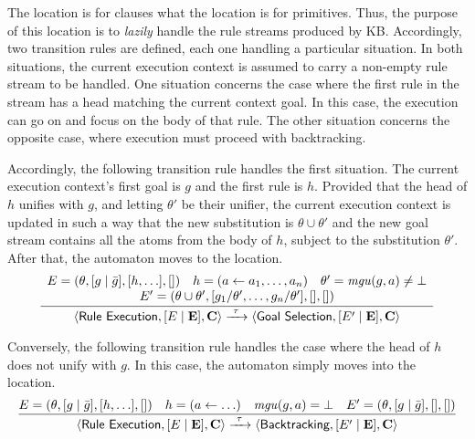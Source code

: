 \documentclass[12pt,a4paper,openright,twoside]{book}
\begin{document}
The  location is for clauses what the  location is for primitives.
%
Thus, the purpose of this location is to \emph{lazily} handle the rule streams produced by KB.
%
Accordingly, two transition rules are defined, each one handling a particular situation.
%
In both situations, the current execution context is assumed to carry a non-empty rule stream to be handled.
%
One situation concerns the case where the first rule in the stream has a head matching the current context goal.
%
In this case, the execution can go on and focus on the body of that rule.
%
The other situation concerns the opposite case, where execution must proceed with backtracking.
%

Accordingly, the following transition rule handles the first situation.
%
The current execution context's first goal is $g$ and the first rule is $h$.
%
Provided that the head of $h$ unifies with $g$, and letting $\theta'$ be their unifier, the current execution context is updated in such a way that the new substitution is $\theta \cup \theta'$ and the new goal stream contains all the atoms from the body of $h$, subject to the substitution $\theta'$.
%
After that, the automaton moves to the  location.
\[
\frac{
    \begin{array}{c}
        E = (\theta, [g \mid \bar{g}], [h, \ldots], [])
        \quad
        h = (a \leftarrow a_1, \ldots, a_n)
        \quad
        \theta' = \mathit{mgu}(g, a) \neq \bot
        \\
        E' = (\theta \cup \theta', [g_1 / \theta', \ldots, g_n / \theta'], [], [])
    \end{array}
}{
    \langle \textsf{Rule Execution}, [E \mid \mathbf{E}], \mathbf{C} \rangle
    \xrightarrow{\ \tau\ }
    \langle \textsf{Goal Selection}, [E' \mid \mathbf{E}], \mathbf{C} \rangle
}
\]

Conversely, the following transition rule handles the case where the head of $h$ does not unify with $g$.
%
In this case, the automaton simply moves into the  location.
%
\[
\frac{
    E = (\theta, [g \mid \bar{g}], [h, \ldots], [])
    \quad
    h = (a \leftarrow \ldots)
    \quad
    \mathit{mgu}(g, a) = \bot
    \quad
    E' = (\theta, [g \mid \bar{g}], [], [])
}{
    \langle \textsf{Rule Execution}, [E \mid \mathbf{E}], \mathbf{C} \rangle
    \xrightarrow{\ \tau\ }
    \langle \textsf{Backtracking}, [E' \mid \mathbf{E}], \mathbf{C} \rangle
}
\]
\end{document}
